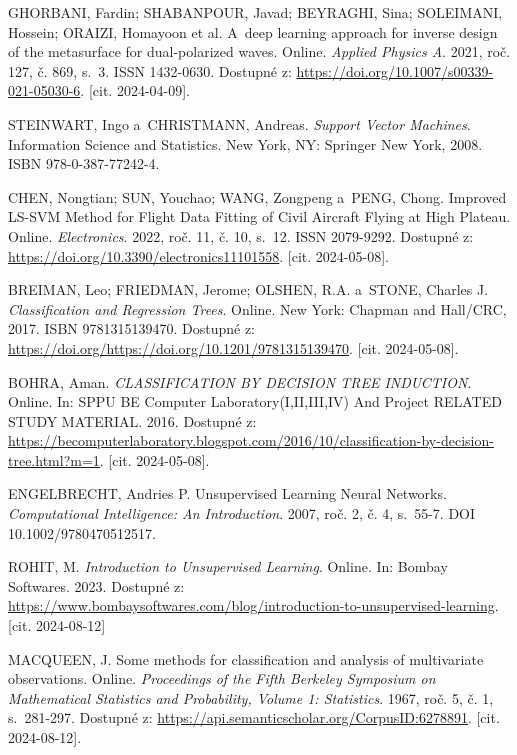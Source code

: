 GHORBANI, Fardin; SHABANPOUR, Javad; BEYRAGHI, Sina; SOLEIMANI, Hossein; ORAIZI, Homayoon et al. A~deep learning approach for inverse design of the metasurface for dual-polarized waves. Online. \textit{Applied Physics A}. 2021, roč. 127, č. 869, s.~3. ISSN 1432-0630. Dostupné z: \url{https://doi.org/10.1007/s00339-021-05030-6}. [cit. 2024-04-09].

STEINWART, Ingo a~CHRISTMANN, Andreas. \textit{Support Vector Machines}. Information Science and Statistics. New York, NY: Springer New York, 2008. ISBN 978-0-387-77242-4.

CHEN, Nongtian; SUN, Youchao; WANG, Zongpeng a~PENG, Chong. Improved LS-SVM Method for Flight Data Fitting of Civil Aircraft Flying at High Plateau. Online. \textit{Electronics}. 2022, roč. 11, č. 10, s.~12. ISSN 2079-9292. Dostupné z: \url{https://doi.org/10.3390/electronics11101558}. [cit. 2024-05-08].

BREIMAN, Leo; FRIEDMAN, Jerome; OLSHEN, R.A. a~STONE, Charles J. \textit{Classification and Regression Trees}. Online. New York: Chapman and Hall/CRC, 2017. ISBN 9781315139470. Dostupné z: \url{https://doi.org/https://doi.org/10.1201/9781315139470}. [cit. 2024-05-08].

BOHRA, Aman. \textit{CLASSIFICATION BY DECISION TREE INDUCTION}. Online. In: SPPU BE Computer Laboratory(I,II,III,IV) And Project RELATED STUDY MATERIAL. 2016. Dostupné z: \url{https://becomputerlaboratory.blogspot.com/2016/10/classification-by-decision-tree.html?m=1}. [cit. 2024-05-08].

ENGELBRECHT, Andries P. Unsupervised Learning Neural Networks. \textit{Computational Intelligence: An Introduction}. 2007, roč. 2, č. 4, s.~55-7. DOI 10.1002/9780470512517.

ROHIT, M. \textit{Introduction to Unsupervised Learning}. Online. In: Bombay Softwares. 2023. Dostupné z: \url{https://www.bombaysoftwares.com/blog/introduction-to-unsupervised-learning}. [cit. 2024-08-12]

MACQUEEN, J. Some methods for classification and analysis of multivariate observations. Online. \textit{Proceedings of the Fifth Berkeley Symposium on Mathematical Statistics and Probability, Volume 1: Statistics}. 1967, roč. 5, č. 1, s.~281-297. Dostupné z: \url{https://api.semanticscholar.org/CorpusID:6278891}. [cit. 2024-08-12].

